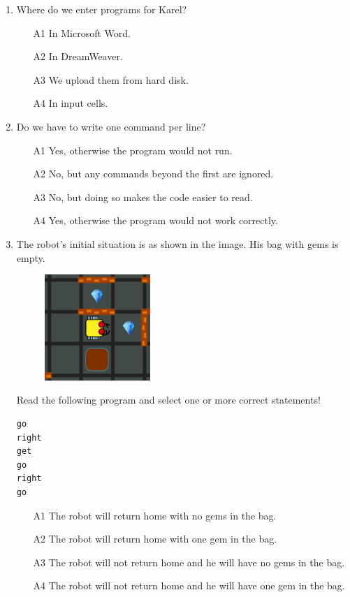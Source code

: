 \begin{enumerate}
\item Where do we enter programs for Karel?
\begin{enumerate}
\item[A1] In Microsoft Word.
\item[A2] In DreamWeaver.
\item[A3] We upload them from hard disk.
\item[A4] In input cells.
\end{enumerate}
\item Do we have to write one command per line?
\begin{enumerate}
\item[A1] Yes, otherwise the program would not run.
\item[A2] No, but any commands beyond the first are ignored.
\item[A3] No, but doing so makes the code easier to read.
\item[A4] Yes, otherwise the program would not work correctly.
\end{enumerate}
\item The robot's initial situation is as shown in the image. His bag with gems is empty.
\begin{figure}[!ht]
\begin{center}
\includegraphics[width=4cm]{imgk/maze-0.png}
\end{center}
\end{figure}
\noindent
Read the following program and select one or more correct statements!
\begin{verbatim}
go
right
get
go
right 
go
\end{verbatim}
\begin{enumerate}
\item[A1] The robot will return home with no gems in the bag.
\item[A2] The robot will return home with one gem in the bag.
\item[A3] The robot will not return home and he will have no gems in the bag.
\item[A4] The robot will not return home and he will have one gem in the bag.

\end{enumerate}
\end{enumerate}
